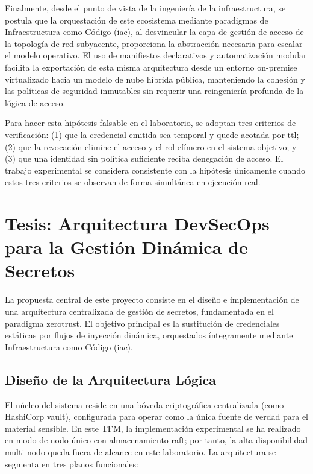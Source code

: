\documentclass[runningheads]{llncs}
\begin{document}
Finalmente, desde el punto de vista de la ingeniería de la infraestructura, se postula que la orquestación de este ecosistema mediante paradigmas de Infraestructura como Código (\gls{iac}), al desvincular la capa de gestión de acceso de la topología de red subyacente, proporciona la abstracción necesaria para escalar el modelo operativo. El uso de manifiestos declarativos y automatización modular facilita la exportación de esta misma arquitectura desde un entorno on-premise virtualizado hacia un modelo de nube híbrida pública, manteniendo la cohesión y las políticas de seguridad inmutables sin requerir una reingeniería profunda de la lógica de acceso.

Para hacer esta hipótesis falsable en el laboratorio, se adoptan tres criterios de verificación: (1) que la credencial emitida sea temporal y quede acotada por \gls{ttl}; (2) que la revocación elimine el acceso y el rol efímero en el sistema objetivo; y (3) que una identidad sin política suficiente reciba denegación de acceso. El trabajo experimental se considera consistente con la hipótesis únicamente cuando estos tres criterios se observan de forma simultánea en ejecución real.


\section{Tesis: Arquitectura DevSecOps para la Gestión Dinámica de Secretos}

La propuesta central de este proyecto consiste en el diseño e implementación de una arquitectura centralizada de gestión de secretos, fundamentada en el paradigma \gls{zerotrust}. El objetivo principal es la sustitución de credenciales estáticas por flujos de inyección dinámica, orquestados íntegramente mediante Infraestructura como Código (\gls{iac}).

\subsection{Diseño de la Arquitectura Lógica}
El núcleo del sistema reside en una bóveda criptográfica centralizada (como HashiCorp \gls{vault}), configurada para operar como la única fuente de verdad para el material sensible. En este TFM, la implementación experimental se ha realizado en modo de nodo único con almacenamiento \gls{raft}; por tanto, la alta disponibilidad multi-nodo queda fuera de alcance en este laboratorio. La arquitectura se segmenta en tres planos funcionales:
\end{document}
